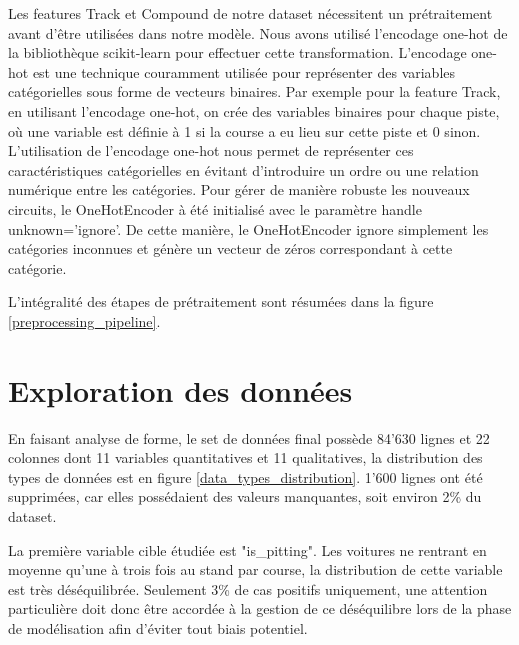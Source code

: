 Les features Track et Compound de notre dataset nécessitent un prétraitement avant d'être utilisées dans notre modèle. Nous avons utilisé l'encodage one-hot de la bibliothèque scikit-learn pour effectuer cette transformation.
L'encodage one-hot est une technique couramment utilisée pour représenter des variables catégorielles sous forme de vecteurs binaires.
Par exemple pour la feature Track, en utilisant l'encodage one-hot, on crée des variables binaires pour chaque piste, où une variable est définie à 1 si la course a eu lieu sur cette piste et 0 sinon.
L'utilisation de l'encodage one-hot nous permet de représenter ces caractéristiques catégorielles en évitant d'introduire un ordre ou une relation numérique entre les catégories.
Pour gérer de manière robuste les nouveaux circuits, le OneHotEncoder à été initialisé avec le paramètre handle unknown='ignore'.
De cette manière, le OneHotEncoder ignore simplement les catégories inconnues et génère un vecteur de zéros correspondant à cette catégorie.

L'intégralité des étapes de prétraitement sont résumées dans la figure \ref{preprocessing_pipeline}.

\section{Exploration des données}
En faisant analyse de forme, le set de données final possède 84'630 lignes et 22 colonnes dont 11 variables quantitatives et 11 qualitatives, la distribution des types de données est en figure \ref{data_types_distribution}.
1'600 lignes ont été supprimées, car elles possédaient des valeurs manquantes, soit environ 2\% du dataset.

La première variable cible étudiée est "is_pitting". Les voitures ne rentrant en moyenne qu'une à trois fois au stand par course, la distribution de cette variable est très déséquilibrée.
Seulement 3\% de cas positifs uniquement, une attention particulière doit donc être accordée à la gestion de ce déséquilibre
lors de la phase de modélisation afin d'éviter tout biais potentiel.

